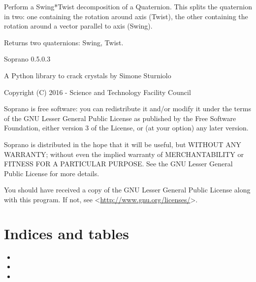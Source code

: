 \documentclass[letterpaper,10pt,english]{sphinxmanual}
\begin{document}
\begin{fulllineitems}
\label{doctree/soprano.utils:soprano.utils.swing_twist_decomp}
Perform a Swing*Twist decomposition of a Quaternion. This splits the
quaternion in two: one containing the rotation around axis (Twist), the
other containing the rotation around a vector parallel to axis (Swing).

Returns two quaternions: Swing, Twist.

\end{fulllineitems}

\label{index:module-soprano}
Soprano 0.5.0.3

A Python library to crack crystals
by Simone Sturniolo

Copyright (C) 2016 - Science and Technology Facility Council

Soprano is free software: you can redistribute it and/or modify
it under the terms of the GNU Lesser General Public License as published by
the Free Software Foundation, either version 3 of the License, or
(at your option) any later version.

Soprano is distributed in the hope that it will be useful,
but WITHOUT ANY WARRANTY; without even the implied warranty of
MERCHANTABILITY or FITNESS FOR A PARTICULAR PURPOSE.  See the
GNU Lesser General Public License for more details.

You should have received a copy of the GNU Lesser General Public License
along with this program.  If not, see \textless{}\href{http://www.gnu.org/licenses/}{http://www.gnu.org/licenses/}\textgreater{}.


\chapter{Indices and tables}
\label{index:indices-and-tables}\begin{itemize}
\item {} 

\item {} 

\item {} 

\end{itemize}
\end{document}
